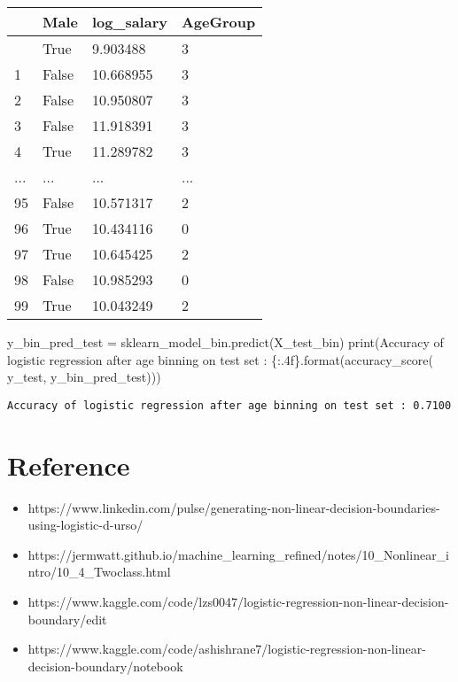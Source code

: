 \documentclass[
  letterpaper,
  DIV=11,
  numbers=noendperiod]{scrreprt}
\newenvironment{Shaded}{\begin{snugshade}}{\end{snugshade}}
\newcommand{\BuiltInTok}[1]{\textcolor[rgb]{0.00,0.23,0.31}{#1}}
\newcommand{\NormalTok}[1]{\textcolor[rgb]{0.00,0.23,0.31}{#1}}
\newcommand{\OperatorTok}[1]{\textcolor[rgb]{0.37,0.37,0.37}{#1}}
\newcommand{\SpecialCharTok}[1]{\textcolor[rgb]{0.37,0.37,0.37}{#1}}
\newcommand{\StringTok}[1]{\textcolor[rgb]{0.13,0.47,0.30}{#1}}
\providecommand{\tightlist}{%
  \setlength{\itemsep}{0pt}\setlength{\parskip}{0pt}}\usepackage{longtable,booktabs,array}
\begin{document}
\begin{longtable}[]{@{}llll@{}}
\toprule\noalign{}
& Male & log\_salary & AgeGroup \\
\midrule\noalign{}
\endhead
\bottomrule\noalign{}
\endlastfoot
0 & True & 9.903488 & 3 \\
1 & False & 10.668955 & 3 \\
2 & False & 10.950807 & 3 \\
3 & False & 11.918391 & 3 \\
4 & True & 11.289782 & 3 \\
... & ... & ... & ... \\
95 & False & 10.571317 & 2 \\
96 & True & 10.434116 & 0 \\
97 & True & 10.645425 & 2 \\
98 & False & 10.985293 & 0 \\
99 & True & 10.043249 & 2 \\
\end{longtable}

\begin{Shaded}
\begin{Highlighting}[]
\NormalTok{y\_bin\_pred\_test }\OperatorTok{=}\NormalTok{ sklearn\_model\_bin.predict(X\_test\_bin)}
\BuiltInTok{print}\NormalTok{(}\StringTok{\textquotesingle{}Accuracy of logistic regression after age binning on test set : }\SpecialCharTok{\{:.4f\}}\StringTok{\textquotesingle{}}\NormalTok{.}\BuiltInTok{format}\NormalTok{(accuracy\_score( y\_test, y\_bin\_pred\_test)))}
\end{Highlighting}
\end{Shaded}

\begin{verbatim}
Accuracy of logistic regression after age binning on test set : 0.7100
\end{verbatim}

\section{Reference}\label{reference}

\begin{itemize}
\tightlist
\item
  https://www.linkedin.com/pulse/generating-non-linear-decision-boundaries-using-logistic-d-urso/
\item
  https://jermwatt.github.io/machine\_learning\_refined/notes/10\_Nonlinear\_intro/10\_4\_Twoclass.html
\item
  https://www.kaggle.com/code/lzs0047/logistic-regression-non-linear-decision-boundary/edit
\item
  https://www.kaggle.com/code/ashishrane7/logistic-regression-non-linear-decision-boundary/notebook
\end{itemize}
\end{document}
